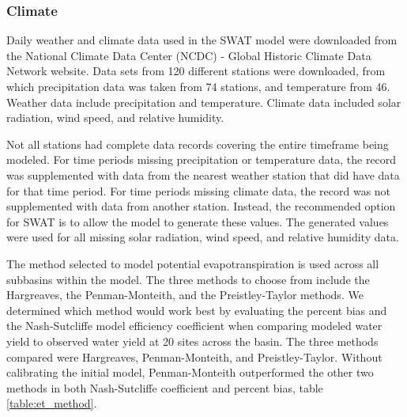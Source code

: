 \subsubsection{Climate}	\label{sec:climate}


Daily weather and climate data used in the SWAT model were downloaded from the National Climate Data Center (NCDC) - Global Historic Climate Data Network website.  Data sets from 120 different stations were downloaded, from which precipitation data was taken from 74 stations, and temperature from 46.  Weather data include precipitation and temperature.  Climate data included solar radiation, wind speed, and relative humidity.  

Not all stations had complete data records covering the entire timeframe being modeled.  For time periods missing precipitation or temperature data, the record was supplemented with data from the nearest weather station that did have data for that time period.  For time periods missing climate data, the record was not supplemented with data from another station.  Instead, the recommended option for SWAT is to allow the model to generate these values.  The generated values were used for all missing solar radiation, wind speed, and relative humidity data. 

The method selected to model potential evapotranspiration is used across all subbasins within the model.  The three methods to choose from include the Hargreaves, the Penman-Monteith, and the Preistley-Taylor methods.  We determined which method would work best by evaluating the percent bias and the Nash-Sutcliffe model efficiency coefficient  when comparing modeled water yield to observed water yield at 20 sites across the basin. The three methods compared were Hargreaves, Penman-Monteith, and Preistley-Taylor. Without calibrating the initial model, Penman-Monteith outperformed the other two methods in both Nash-Sutcliffe coefficient and percent bias, table \ref{table:et_method}.

